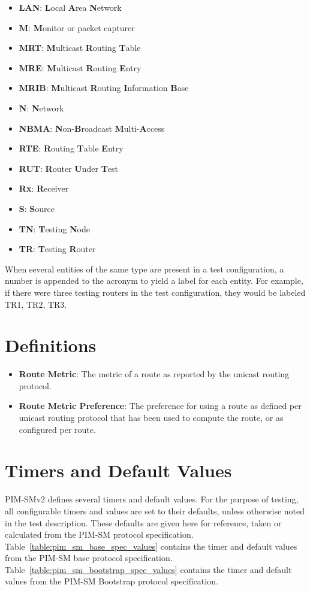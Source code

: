 \documentclass[11pt]{report}
\begin{document}
\begin{itemize}
  \item {\bf LAN}: {\bf L}ocal {\bf A}rea {\bf N}etwork
  \item {\bf M}: {\bf M}onitor or packet capturer
  \item {\bf MRT}: {\bf M}ulticast {\bf R}outing {\bf T}able
  \item {\bf MRE}: {\bf M}ulticast {\bf R}outing {\bf E}ntry
  \item {\bf MRIB}: {\bf M}ulticast {\bf R}outing {\bf I}nformation {\bf B}ase
  \item {\bf N}: {\bf N}etwork
  \item {\bf NBMA}: {\bf N}on-{\bf B}roadcast {\bf M}ulti-{\bf A}ccess
  \item {\bf RTE}: {\bf R}outing {\bf T}able {\bf E}ntry
  \item {\bf RUT}: {\bf R}outer {\bf U}nder {\bf T}est
  \item {\bf Rx}: {\bf R}eceiver
  \item {\bf S}: {\bf S}ource
  \item {\bf TN}: {\bf T}esting {\bf N}ode
  \item {\bf TR}: {\bf T}esting {\bf R}outer
\end{itemize}

When several entities of the same type are present in a test configuration, a
number is appended to the acronym to yield a label for each entity. For
example, if there were three testing routers in the test configuration, they
would be labeled TR1, TR2, TR3.

\section{Definitions}

\begin{itemize}
  \item {\bf Route Metric}: The metric of a route as reported by the unicast
  routing protocol.

  \item {\bf Route Metric Preference}: The preference for using a route as
  defined per unicast routing protocol that has been used to compute the
  route, or as configured per route.

\end{itemize}

\section{Timers and Default Values}
PIM-SMv2 defines several timers and default values. For the purpose of
testing, all configurable timers and values are set to their defaults, unless
otherwise noted in the test description. These defaults are given here for
reference, taken or calculated from the PIM-SM
protocol specification.
Table~\ref{table:pim_sm_base_spec_values} contains the timer and default values
from the PIM-SM base protocol specification.
Table~\ref{table:pim_sm_bootstrap_spec_values} contains the timer and default
values from the PIM-SM Bootstrap protocol specification.
\end{document}
